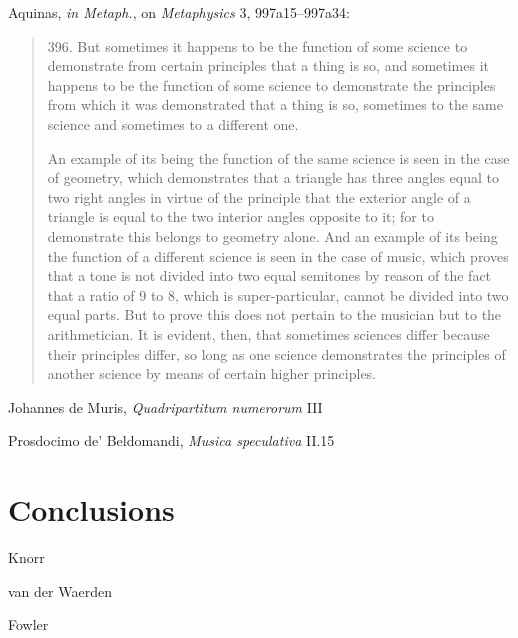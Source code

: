 \documentclass{article}
\theoremstyle{definition}
\begin{document}
Aquinas, {\em in Metaph.}, on {\em Metaphysics} 3, 997a15--997a34:

\begin{quote}
396. But sometimes it happens to be the function of some science to demonstrate from certain principles that a thing is so, and sometimes it happens to be the function of some science to demonstrate the principles from which it was demonstrated that a thing is so, sometimes to the same science and sometimes to a different one.

An example of its being the function of the same science is seen in the case of geometry, which demonstrates that a triangle has three angles equal to two right angles in virtue of the principle that the exterior angle of a triangle is equal to the two interior angles opposite to it; for to demonstrate this belongs to geometry alone. And an example of its being the function of a different science is seen in the case of music, which proves that a tone is not divided into two equal semitones by reason of the fact that a ratio of 9 to 8, which is super-particular, cannot be divided into two equal parts. But to prove this does not pertain to the musician but to the arithmetician. It is evident, then, that sometimes sciences differ because their principles differ, so long as one science demonstrates the principles of another science by means of certain higher principles.
\end{quote}

Johannes de Muris, {\em Quadripartitum numerorum} III \cite[p.~270]{huillier}

Prosdocimo de' Beldomandi, {\em Musica speculativa} II.15 \cite[pp.~198]{herlinger}






\section{Conclusions}
Knorr \cite{knorr}

van der Waerden \cite{waerden}

Fowler \cite{fowler}




\end{document}
